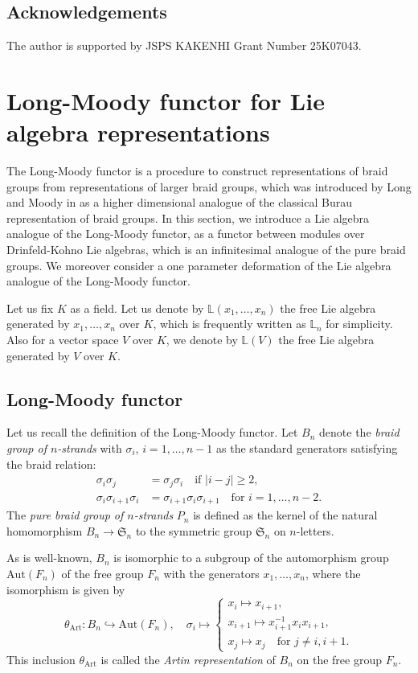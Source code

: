 \documentclass[a4paper,12pt]{article}
\theoremstyle{definition}
\theoremstyle{remark}
\begin{document}
\subsection{Acknowledgements}
The author is supported by JSPS KAKENHI Grant Number 25K07043.
\section{Long-Moody functor for Lie algebra representations}\label{sec:longmoody}
The Long-Moody functor is a procedure to construct representations of braid groups from representations of larger braid groups,
which was introduced by Long and Moody in \cite{Lo94} as a higher dimensional analogue of the classical Burau representation of braid groups.
In this section, we introduce a Lie algebra analogue of the Long-Moody functor, as a functor between modules over Drinfeld-Kohno Lie algebras, which is an infinitesimal analogue of the pure braid groups.
We moreover consider a one parameter deformation of the Lie algebra analogue of the Long-Moody functor.

Let us fix $K$ as a field. Let us denote by $\mathbb{L}(x_{1},\ldots,x_{n})$
the free Lie algebra generated by $x_{1},\ldots,x_{n}$ over $K$,
which is frequently written as $\mathbb{L}_{n}$ for simplicity.
Also for a vector space $V$ over $K$, we denote by $\mathbb{L}(V)$ 
the free Lie algebra generated by $V$ over $K$.
\subsection{Long-Moody functor}
Let us  recall the definition of the Long-Moody functor.
Let $B_{n}$ denote the \emph{braid group of $n$-strands} 
with $\sigma_{i}$, $i=1,\ldots,n-1$ as the standard generators
satisfying the braid relation:
\begin{align*}
	\sigma_{i}\sigma_{j}&=\sigma_{j}\sigma_{i} \quad \text{if $|i-j|\ge 2$},\\
	\sigma_{i}\sigma_{i+1}\sigma_{i}&=\sigma_{i+1}\sigma_{i}\sigma_{i+1} \quad \text{for $i=1,\ldots,n-2$}.
\end{align*}
The \emph{pure braid group of $n$-strands} $P_{n}$ is defined as the kernel of the natural homomorphism $B_{n}\to \mathfrak{S}_{n}$ to
the symmetric group $\mathfrak{S}_{n}$ on $n$-letters.

As is well-known, $B_{n}$
is isomorphic to a subgroup of the automorphism group $\mathrm{Aut}(F_{n})$ of the free group $F_{n}$ with the generators $x_{1},\ldots,x_{n}$, where the isomorphism is given by
\[
	\theta_{\mathrm{Art}}\colon B_{n}\hookrightarrow \mathrm{Aut}(F_{n}), \quad \sigma_{i}\mapsto \begin{cases}
		x_{i}\mapsto x_{i+1},\\
	x_{i+1}\mapsto x_{i+1}^{-1}x_{i}x_{i+1},\\
	x_{j}\mapsto x_{j} \quad \text{for $j\neq i,i+1$}.
	\end{cases}
\]
This inclusion $\theta_{\mathrm{Art}}$ is called the \emph{Artin representation} of $B_{n}$
on the free group $F_{n}$.
\end{document}
